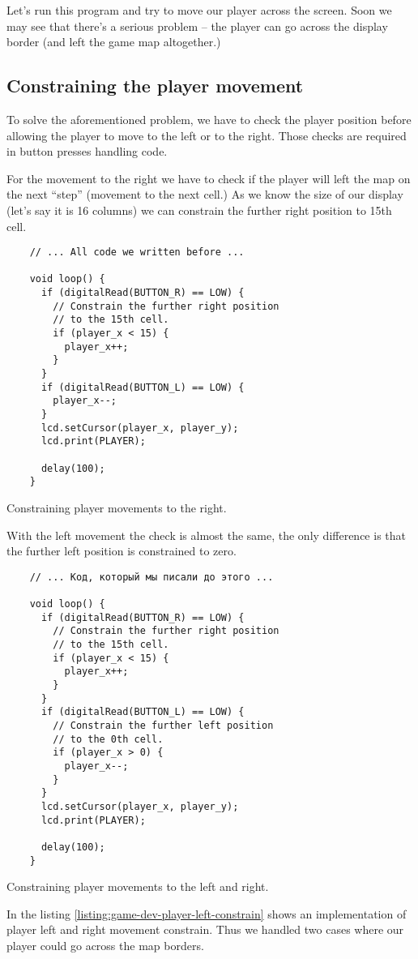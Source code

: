 \documentclass[../sparc.tex]{subfiles}
\begin{document}
Let's run this program and try to move our player across the screen.  Soon we
may see that there's a serious problem -- the player can go across the display
border (and left the game map altogether.)

\subsection{Constraining the player movement}

To solve the aforementioned problem, we have to check the player position before
allowing the player to move to the left or to the right.  Those checks are
required in button presses handling code.

For the movement to the right we have to check if the player will left the map
on the next ``step'' (movement to the next cell.)  As we know the size of our
display (let's say it is 16 columns) we can constrain the further right position
to 15th cell.

\begin{listing}[H]
  \begin{verbatim}
    // ... All code we written before ...

    void loop() {
      if (digitalRead(BUTTON_R) == LOW) {
        // Constrain the further right position
        // to the 15th cell.
        if (player_x < 15) {
          player_x++;
        }
      }
      if (digitalRead(BUTTON_L) == LOW) {
        player_x--;
      }
      lcd.setCursor(player_x, player_y);
      lcd.print(PLAYER);

      delay(100);
    }
  \end{verbatim}
  \caption{Constraining player movements to the right.}
  \label{listing:game-dev-player-right--constrain}
\end{listing}

With the left movement the check is almost the same, the only difference is that
the further left position is constrained to zero.

\begin{listing}[ht]
  \begin{verbatim}
    // ... Код, который мы писали до этого ...

    void loop() {
      if (digitalRead(BUTTON_R) == LOW) {
        // Constrain the further right position
        // to the 15th cell.
        if (player_x < 15) {
          player_x++;
        }
      }
      if (digitalRead(BUTTON_L) == LOW) {
        // Constrain the further left position
        // to the 0th cell.
        if (player_x > 0) {
          player_x--;
        }
      }
      lcd.setCursor(player_x, player_y);
      lcd.print(PLAYER);

      delay(100);
    }
  \end{verbatim}
  \caption{Constraining player movements to the left and right.}
  \label{listing:game-dev-player-left-constrain}
\end{listing}

In the listing \ref{listing:game-dev-player-left-constrain} shows an
implementation of player left and right movement constrain.  Thus we handled two
cases where our player could go across the map borders.
\end{document}
